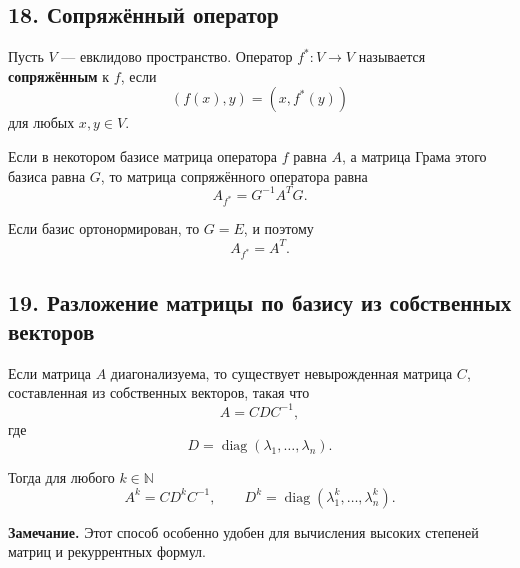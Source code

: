 \subsection*{18. Сопряжённый оператор}

Пусть $V$ --- евклидово пространство. Оператор $f^*:V\to V$ называется \textbf{сопряжённым} к $f$, если
\[
(f(x),y)=(x,f^*(y))
\]
для любых $x,y\in V$.

Если в некотором базисе матрица оператора $f$ равна $A$, а матрица Грама этого базиса равна $G$, то матрица сопряжённого оператора равна
\[
A_{f^*}=G^{-1}A^TG.
\]

Если базис ортонормирован, то $G=E$, и поэтому
\[
A_{f^*}=A^T.
\]

\subsection*{19. Разложение матрицы по базису из собственных векторов}

Если матрица $A$ диагонализуема, то существует невырожденная матрица $C$, составленная из собственных векторов, такая что
\[
A=CDC^{-1},
\]
где
\[
D=\operatorname{diag}(\lambda_1,\dots,\lambda_n).
\]

Тогда для любого $k\in\mathbb N$
\[
A^k=CD^kC^{-1},
\qquad
D^k=\operatorname{diag}(\lambda_1^k,\dots,\lambda_n^k).
\]

\noindent
\textbf{Замечание.}
Этот способ особенно удобен для вычисления высоких степеней матриц и рекуррентных формул.
